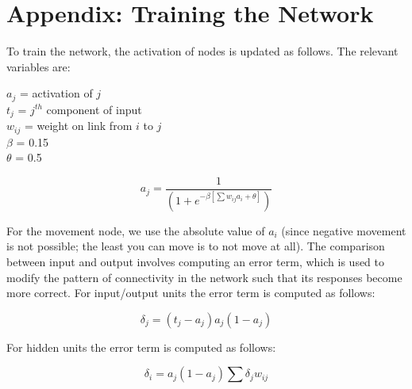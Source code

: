 \documentclass[a4paper,12pt,man,british]{apa6}
\begin{document}
\newpage
\section{Appendix: Training the Network}

To train the network, the activation of nodes is updated as follows. The relevant variables are:
\bigskip

\noindent $a_j$ = activation of $j$ \\
\noindent $t_j$ = $j^{th}$ component of input \\
\noindent $w_{ij}$ = weight on link from $i$ to $j$ \\
\noindent $\beta$ = 0.15  \\
\noindent $\theta$ = 0.5

\begin{equation}
a_{j} =  \frac{1}{(1 + e^{-\beta[\sum w_{ij}a_i+\theta]})}
\label{eq:activation}
\end{equation}

\indent For the movement node, we use the absolute value of $a_i$ (since negative movement is not possible; the least you can move is to not move at all). The comparison between input and output involves computing an error term, which is used to modify the pattern of connectivity in the network such that its responses become more correct. For input/output units the error term is computed as follows:

\begin{equation}
\delta_{j} =  (t_j - a_j)a_j(1 - a_j)
\label{eq:error-io}
\end{equation}

\indent For hidden units the error term is computed as follows:

\begin{equation}
\delta_{i} =  a_j(1 - a_j)\sum \delta_{j}w_{ij}
\label{eq:error-h}
\end{equation}                                              
\end{document}
